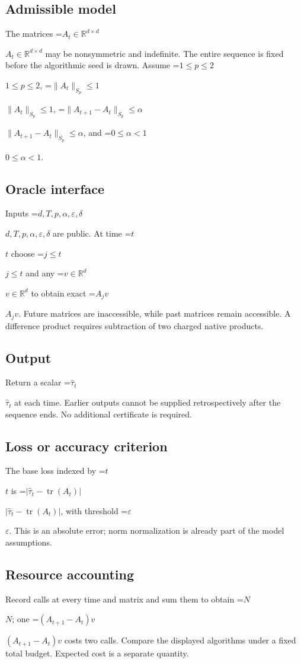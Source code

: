 \documentclass[10pt,a4paper]{article}
\newcommand{\AtlasMath}[1]{\par\begingroup\centering\setbox0=\hbox{$\displaystyle #1$}\ifdim\wd0>1.4\linewidth\typeout{ATLAS WIDE FORMULA: \the\wd0}\fi\ifdim\wd0>\linewidth\resizebox{\linewidth}{!}{\box0}\else\box0\fi\par\endgroup}
\newcommand{\AtlasInlineMath}[1]{\begingroup\setbox0=\hbox{$#1$}\ifdim\wd0>.4\linewidth\endgroup\AtlasMath{#1}\else\endgroup$#1$\fi}
\begin{document}
\subsection{Admissible model}
The matrices \AtlasInlineMath{A_t\in\mathbb{R}^{d\times d}} may be nonsymmetric and indefinite. The entire sequence is fixed before the algorithmic seed is drawn. Assume \AtlasInlineMath{1\le p\le2}, \AtlasInlineMath{\|A_t\|_{S_p}\le1}, \AtlasInlineMath{\|A_{t+1}-A_t\|_{S_p}\le\alpha}, and \AtlasInlineMath{0\le\alpha<1}.

\subsection{Oracle interface}
Inputs \AtlasInlineMath{d,T,p,\alpha,\varepsilon,\delta} are public. At time \AtlasInlineMath{t} choose \AtlasInlineMath{j\le t} and any \AtlasInlineMath{v\in\mathbb{R}^d} to obtain exact \AtlasInlineMath{A_jv}. Future matrices are inaccessible, while past matrices remain accessible. A difference product requires subtraction of two charged native products.

\subsection{Output}
Return a scalar \AtlasInlineMath{\widehat\tau_t} at each time. Earlier outputs cannot be supplied retrospectively after the sequence ends. No additional certificate is required.

\subsection{Loss or accuracy criterion}
The base loss indexed by \AtlasInlineMath{t} is \AtlasInlineMath{|\widehat\tau_t-\operatorname{tr}(A_t)|}, with threshold \AtlasInlineMath{\varepsilon}. This is an absolute error; norm normalization is already part of the model assumptions.

\subsection{Resource accounting}
Record calls at every time and matrix and sum them to obtain \AtlasInlineMath{N}; one \AtlasInlineMath{(A_{t+1}-A_t)v} costs two calls. Compare the displayed algorithms under a fixed total budget. Expected cost is a separate quantity.
\end{document}
